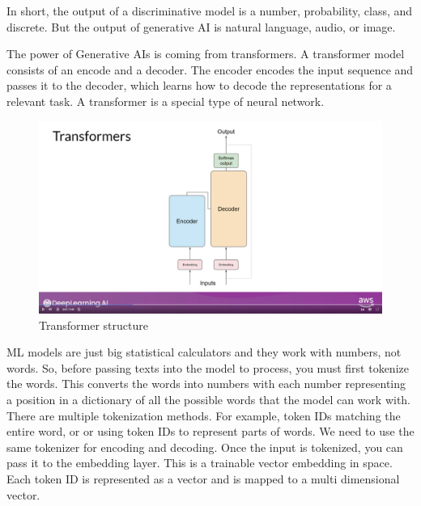 \documentclass[12pt]{report}
\begin{document}
In short, the output of a discriminative model is a number, probability, class, and discrete. But the output of generative AI is natural language, audio, or image.


The power of Generative AIs is coming from transformers. A transformer model consists of an encode and a decoder. The encoder encodes the input sequence and passes it to the decoder, which learns how to decode the representations for a relevant task. A transformer is a special type of neural network.


\begin{figure}[H]
  \centering
  \caption{Transformer structure}
  \includegraphics[scale=0.2]{pics/transformers.png}
\end{figure}

ML models are just big statistical calculators and they work with numbers, not words. So, before passing texts into the model to process, you must first tokenize the words. This converts the words into numbers with each number representing a position in a dictionary of all the possible words that the model can work with. There are multiple tokenization methods. For example, token IDs matching the entire word, or or using token IDs to represent parts of words. We need to use the same tokenizer for encoding and decoding. Once the input is tokenized, you can pass it to the embedding layer. This is a trainable vector embedding in space. Each token ID is represented as a vector and is mapped to a multi dimensional vector.
\end{document}
